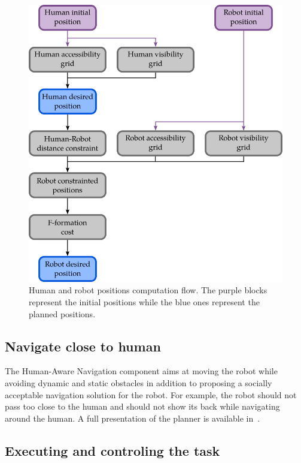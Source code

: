 \begin{figure}[ht!]
\centering
\includegraphics[scale=0.45]{figures/chapter8/svp.png}
\caption{\label{fig:chap8_svp} Human and robot positions computation flow. The purple blocks represent the initial positions while the blue ones represent the planned positions. }
\end{figure}

\subsection{Navigate close to human}

The Human-Aware Navigation component aims at moving the robot while avoiding dynamic and static obstacles in addition to proposing a socially acceptable navigation solution for the robot. For example, the robot should not pass too close to the human and should not show its back while navigating around the human. A full presentation of the planner is available in~\cite{singamaneni_2020_hateb}.

\subsection{Executing and controling the task}

